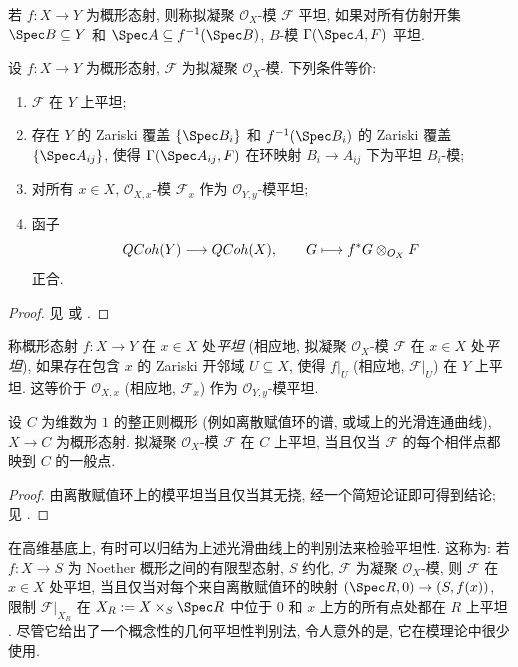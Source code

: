 若 $f:X\to Y$ 为概形态射, 则称拟凝聚 $\mathcal O_X$-模 $\mathcal F$ 平坦, 如果对所有仿射开集 $\Spec B\subseteq Y$ 和 $\Spec A\subseteq f^{-1}(\Spec B)$, $B$-模 $\Gamma(\Spec A,\mathcal F)$ 平坦.
\begin{proposition}[平坦性的等价条件]\label{src:A.2.1}
设 $f:X\to Y$ 为概形态射, $\mathcal F$ 为拟凝聚 $\mathcal O_X$-模. 下列条件等价:
\begin{enumerate}[(1)]
\item $\mathcal F$ 在 $Y$ 上平坦;
\item 存在 $Y$ 的 Zariski 覆盖 $\{\Spec B_i\}$ 和 $f^{-1}(\Spec B_i)$ 的 Zariski 覆盖 $\{\Spec A_{ij}\}$, 使得 $\Gamma(\Spec A_{ij},\mathcal F)$ 在环映射 $B_i\to A_{ij}$ 下为平坦 $B_i$-模;
\item 对所有 $x\in X$, $\mathcal O_{X,x}$-模 $\mathcal F_x$ 作为 $\mathcal O_{Y,y}$-模平坦;
\item 函子
\[
QCoh(Y)\longrightarrow QCoh(X),\qquad G\longmapsto f^*G\otimes_{O_X}F
\]
正合.
\end{enumerate}
\end{proposition}
\begin{proof}
见 \cite[\S III.$9$]{Har77} 或 \cite[Tag 01U2]{SP}.
\end{proof}
称概形态射 $f:X\to Y$ 在 $x\in X$ 处\textit{平坦} (相应地, 拟凝聚 $\mathcal O_X$-模 $\mathcal F$ 在 $x\in X$ 处\textit{平坦}), 如果存在包含 $x$ 的 Zariski 开邻域 $U\subseteq X$, 使得 $f|_U$ (相应地, $\mathcal F|_U$) 在 $Y$ 上平坦. 这等价于 $\mathcal O_{X,x}$ (相应地, $\mathcal F_x$) 作为 $\mathcal O_{Y,y}$-模平坦.
\begin{proposition}[光滑曲线上的平坦性判别法]\label{src:A.2.2}
设 $C$ 为维数为 $1$ 的整正则概形 (例如离散赋值环的谱, 或域上的光滑连通曲线), $X\to C$ 为概形态射. 拟凝聚 $\mathcal O_X$-模 $\mathcal F$ 在 $C$ 上平坦, 当且仅当 $\mathcal F$ 的每个相伴点都映到 $C$ 的一般点.
\end{proposition}
\begin{proof}
由离散赋值环上的模平坦当且仅当其无挠, 经一个简短论证即可得到结论; 见 \cite[III.$9.7$]{Har77}.
\end{proof}
在高维基底上, 有时可以归结为上述光滑曲线上的判别法来检验平坦性. 这称为: 若 $f:X\to S$ 为 Noether 概形之间的有限型态射, $S$ 约化, $\mathcal F$ 为凝聚 $\mathcal O_X$-模, 则 $\mathcal F$ 在 $x\in X$ 处平坦, 当且仅当对每个来自离散赋值环的映射 $(\Spec R,0)\to(S,f(x))$, 限制 $\mathcal F|_{X_R}$ 在 $X_R:=X\times_S\Spec R$ 中位于 $0$ 和 $x$ 上方的所有点处都在 $R$ 上平坦 \cite[IV.$11.8.1$]{EGA}. 尽管它给出了一个概念性的几何平坦性判别法, 令人意外的是, 它在模理论中很少使用.
